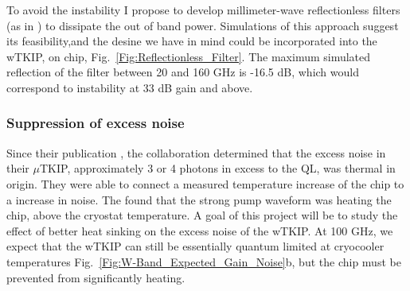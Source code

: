 To avoid the instability I propose to develop millimeter-wave reflectionless filters (as in \cite{Morgan2011})  to dissipate the out of band power. Simulations of this approach suggest its feasibility,and the desine we have in mind could be incorporated into the wTKIP, on chip, Fig.~\ref{Fig:Reflectionless_Filter}. The maximum simulated reflection of the filter between 20 and 160 GHz is -16.5 dB, which would correspond to instability at 33 dB gain and above. 

\subsubsection{Suppression of excess noise}
Since their publication \cite{Eom2012}, the collaboration determined that the excess noise in their $\mu$TKIP, approximately 3 or 4 photons in excess to the QL, was thermal in origin. They were able to connect a measured temperature increase of the chip to a increase in noise. The found that the strong pump waveform was heating the chip, above the cryostat temperature. A goal of this project will be to study the effect of better heat sinking on the excess noise of the wTKIP. At 100 GHz, we expect that the wTKIP can still be essentially quantum limited at cryocooler temperatures Fig.~\ref{Fig:W-Band_Expected_Gain_Noise}b, but the chip must be prevented from significantly heating. 







\singlespacing
\footnotesize
\printbibliography








%
%
%

%
%
